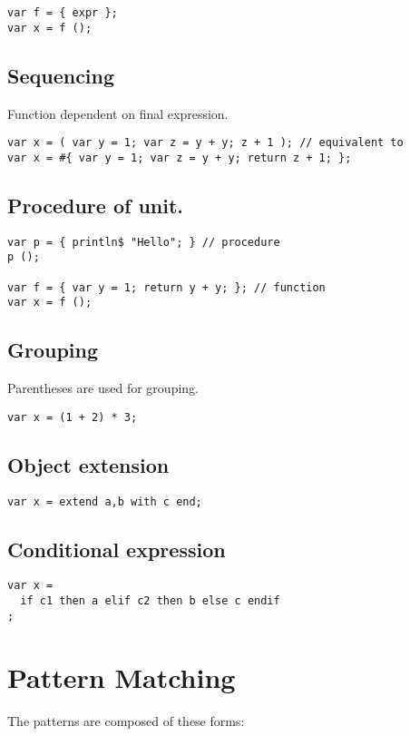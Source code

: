 \documentclass[oneside]{book}
\begin{document}
\begin{verbatim}
var f = { expr };
var x = f ();
\end{verbatim}


\section{Sequencing}
Function dependent on final expression.

\begin{verbatim}
var x = ( var y = 1; var z = y + y; z + 1 ); // equivalent to
var x = #{ var y = 1; var z = y + y; return z + 1; };
\end{verbatim}


\section{Procedure of unit.}

\begin{verbatim}
var p = { println$ "Hello"; } // procedure
p (); 

var f = { var y = 1; return y + y; }; // function
var x = f ();
\end{verbatim}


\section{Grouping}
Parentheses are used for grouping.

\begin{verbatim}
var x = (1 + 2) * 3;
\end{verbatim}


\section{Object extension}

\begin{verbatim}
var x = extend a,b with c end;
\end{verbatim}


\section{Conditional expression}

\begin{verbatim}
var x =
  if c1 then a elif c2 then b else c endif
;
\end{verbatim}

\chapter{Pattern Matching}
The patterns
are composed of these forms:
\end{document}
